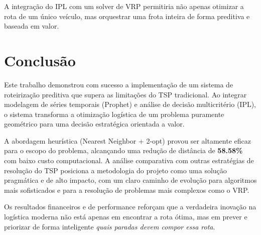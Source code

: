 \documentclass[11pt,a4paper,twocolumn]{article}
\begin{document}
A integração do IPL com um solver de VRP permitiria não apenas otimizar a rota de um único veículo, mas orquestrar uma frota inteira de forma preditiva e baseada em valor.

\section{Conclusão}

Este trabalho demonstrou com sucesso a implementação de um sistema de roteirização preditiva que supera as limitações do TSP tradicional. Ao integrar modelagem de séries temporais (Prophet) e análise de decisão multicritério (IPL), o sistema transforma a otimização logística de um problema puramente geométrico para uma decisão estratégica orientada a valor.

A abordagem heurística (Nearest Neighbor + 2-opt) provou ser altamente eficaz para o escopo do problema, alcançando uma redução de distância de \textbf{58.58\%} com baixo custo computacional. A análise comparativa com outras estratégias de resolução do TSP posiciona a metodologia do projeto como uma solução pragmática e de alto impacto, com um claro caminho de evolução para algoritmos mais sofisticados e para a resolução de problemas mais complexos como o VRP.

Os resultados financeiros e de performance reforçam que a verdadeira inovação na logística moderna não está apenas em encontrar a rota ótima, mas em prever e priorizar de forma inteligente \textit{quais paradas devem compor essa rota}.
\end{document}
